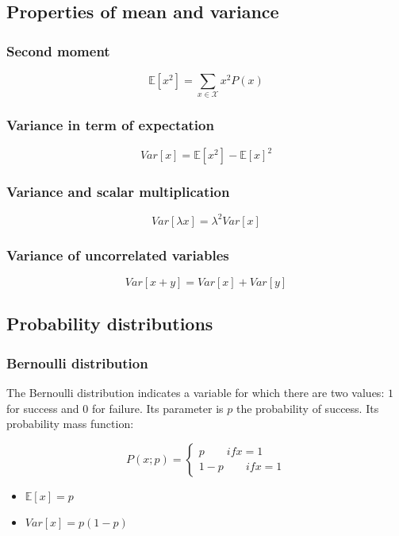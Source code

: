 	\subsection{Properties of mean and variance}

		\subsubsection{Second moment}

		$$\mathbb{E}[x^2] = \sum\limits_{x\in\mathcal{X}}x^2P(x)$$

		\subsubsection{Variance in term of expectation}

		$$Var[x] = \mathbb{E}[x^2] - \mathbb{E}[x]^2$$

		\subsubsection{Variance and scalar multiplication}

		$$Var[\lambda x] = \lambda^2Var[x]$$

		\subsubsection{Variance of uncorrelated variables}

		$$Var[x+y] = Var[x] + Var[y]$$

	\subsection{Probability distributions}

		\subsubsection{Bernoulli distribution}
		The Bernoulli distribution indicates a variable for which there are two values: $1$ for success and $0$ for failure.
		Its parameter is $p$ the probability of success.
		Its probability mass function:

		$$P(x;p) = \begin{cases} p\qquad if x = 1\\ 1-p \qquad if x = 1\end{cases}$$

		\begin{multicols}{2}
			\begin{itemize}
				\item $\mathbb{E}[x] = p$
				\item $Var[x] = p(1-p)$
			\end{itemize}
		\end{multicols}
		
